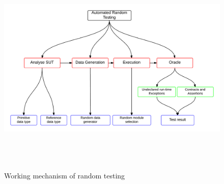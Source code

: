 \bigskip
\begin{figure}[ht]
	\centering
	\centerline{\includegraphics[width=16cm, height=10.5cm ]{chapter2/randomTestingMechanism.png}}
	\bigskip
	\caption{Working mechanism of random testing}
	\label{fig:workingmechanism}
\end{figure}
\bigskip

